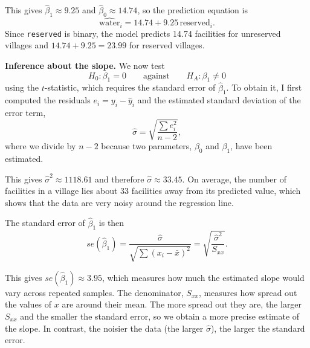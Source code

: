 \documentclass[12pt,letterpaper]{article}
\begin{document}
\begin{enumerate}
		
		
		
		\noindent This gives $\hat\beta_1 \approx 9.25$ and $\hat\beta_0 \approx 14.74$, so the prediction equation is
		\begin{equation*}
			\widehat{\text{water}}_i = 14.74 + 9.25\,\text{reserved}_i.
		\end{equation*}
		Since \texttt{reserved} is binary, the model predicts 14.74 facilities for unreserved villages and $14.74 + 9.25 = 23.99$ for reserved villages.
		
		
		
		\noindent\textbf{Inference about the slope.} We now test
		\begin{equation*}
			H_0: \beta_1 = 0 \qquad \text{against} \qquad H_A: \beta_1 \neq 0
		\end{equation*}
		using the $t$-statistic, which requires the standard error of $\hat\beta_1$. To obtain it, I first computed the residuals $e_i = y_i - \hat{y}_i$ and the estimated standard deviation of the error term,
		\begin{equation*}
			\hat\sigma = \sqrt{\frac{\sum e_i^2}{n-2}},
		\end{equation*}
		where we divide by $n - 2$ because two parameters, $\beta_0$ and $\beta_1$, have been estimated.
		
		
		
		\noindent This gives $\hat\sigma^2 \approx 1118.61$ and therefore $\hat\sigma \approx 33.45$. On average, the number of facilities in a village lies about 33 facilities away from its predicted value, which shows that the data are very noisy around the regression line.
		
		\vspace{.25cm}
		\noindent The standard error of $\hat\beta_1$ is then
		\begin{equation*}
			se(\hat\beta_1) = \frac{\hat\sigma}{\sqrt{\sum (x_i - \bar{x})^2}} = \sqrt{\frac{\hat\sigma^2}{S_{xx}}}.
		\end{equation*}
		
		
		
		\noindent This gives $se(\hat\beta_1) \approx 3.95$, which measures how much the estimated slope would vary across repeated samples. The denominator, $S_{xx}$, measures how spread out the values of $x$ are around their mean. The more spread out they are, the larger $S_{xx}$ and the smaller the standard error, so we obtain a more precise estimate of the slope. In contrast, the noisier the data (the larger $\hat\sigma$), the larger the standard error.
		

\end{enumerate}
\end{document}
